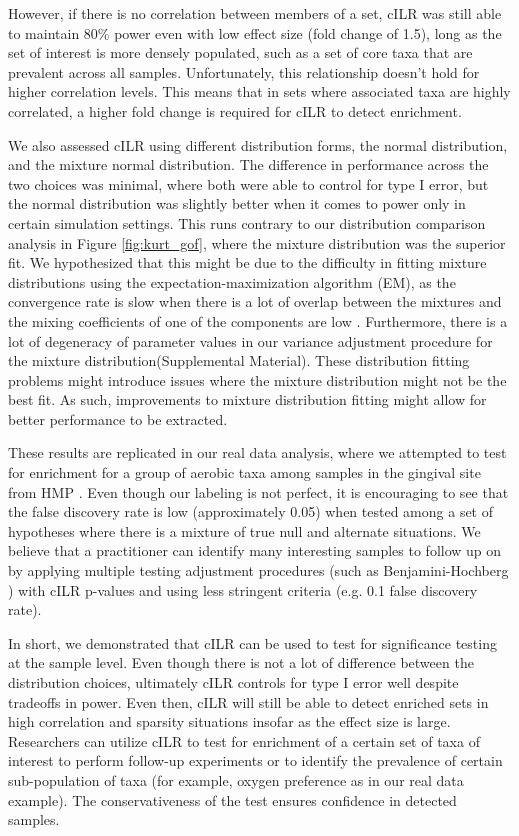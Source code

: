 \documentclass[10pt,letterpaper]{article}
\begin{document}
However, if there is no correlation between members of a set, cILR was still able to maintain 80\% power even with low effect size (fold change of 1.5), long as the set of interest is more densely populated, such as a set of core taxa that are prevalent across all samples. Unfortunately, this relationship doesn't hold for higher correlation levels. This means that in sets where associated taxa are highly correlated, a higher fold change is required for cILR to detect enrichment. 

We also assessed cILR using different distribution forms, the normal distribution, and the mixture normal distribution. The difference in performance across the two choices was minimal, where both were able to control for type I error, but the normal distribution was slightly better when it comes to power only in certain simulation settings. This runs contrary to our distribution comparison analysis in Figure \ref{fig:kurt_gof}, where the mixture distribution was the superior fit. We hypothesized that this might be due to the difficulty in fitting mixture distributions using the expectation-maximization algorithm (EM), as the convergence rate is slow when there is a lot of overlap between the mixtures and the mixing coefficients of one of the components are low \cite{naim}. Furthermore, there is a lot of degeneracy of parameter values in our variance adjustment procedure for the mixture distribution(Supplemental Material). These distribution fitting problems might introduce issues where the mixture distribution might not be the best fit. As such, improvements to mixture distribution fitting might allow for better performance to be extracted.  

These results are replicated in our real data analysis, where we attempted to test for enrichment for a group of aerobic taxa among samples in the gingival site from HMP \cite{consortium2012}. Even though our labeling is not perfect, it is encouraging to see that the false discovery rate is low (approximately 0.05) when tested among a set of hypotheses where there is a mixture of true null and alternate situations. We believe that a practitioner can identify many interesting samples to follow up on by applying multiple testing adjustment procedures (such as Benjamini-Hochberg \cite{benjamini1995}) with cILR p-values and using less stringent criteria (e.g. 0.1 false discovery rate).  

In short, we demonstrated that cILR can be used to test for significance testing at the sample level. Even though there is not a lot of difference between the distribution choices, ultimately cILR controls for type I error well despite tradeoffs in power. Even then, cILR will still be able to detect enriched sets in high correlation and sparsity situations insofar as the effect size is large. Researchers can utilize cILR to test for enrichment of a certain set of taxa of interest to perform follow-up experiments or to identify the prevalence of certain sub-population of taxa (for example, oxygen preference as in our real data example). The conservativeness of the test ensures confidence in detected samples.  
\end{document}
